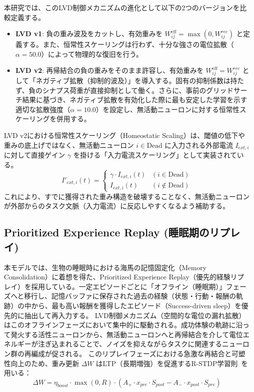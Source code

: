 \documentclass[submit]{ipsj}
\begin{document}
本研究では、このLVD制御メカニズムの進化として以下の2つのバージョンを比較定義する。
\begin{itemize}
    \item \textbf{LVD v1}: 負の重み波及をカットし、有効重みを $W_{ij}^{\text{eff}} = \max(0, W_{ij}^{rec})$ と定義する。また、恒常性スケーリングは行わず、十分な強さの電位拡散（$\alpha=50.0$）によって物理的な復旧を行う。
    \item \textbf{LVD v2}: 再帰結合の負の重みをそのまま許容し、有効重みを $W_{ij}^{\text{eff}} = W_{ij}^{rec}$ として「ネガティブ拡散（抑制的波及）」を導入する。固有の抑制係数は持たず、負のシナプス荷重が直接抑制として働く。さらに、事前のグリッドサーチ結果に基づき、ネガティブ拡散を有効化した際に最も安定した学習を示す適切な拡散強度（$\alpha=10.0$）を設定し、無活動ニューロンに対する恒常性スケーリングを併用する。
\end{itemize}

LVD v2における恒常性スケーリング（Homeostatic Scaling）は、閾値の低下や重みの底上げではなく、無活動ニューロン $i \in \text{Dead}$ に入力される外部電流 $I_{ext,i}$ に対して直接ゲイン $\gamma$ を掛ける「入力電流スケーリング」として実装されている。
\begin{equation}
I'_{ext,i}(t) = 
\begin{cases} 
\gamma \cdot I_{ext,i}(t) & (i \in \text{Dead}) \\
I_{ext,i}(t) & (i \notin \text{Dead})
\end{cases}
\end{equation}
これにより、すでに獲得された重み構造を破壊することなく、無活動ニューロンが外部からのタスク文脈（入力電流）に反応しやすくなるよう補助する。

\subsection{Prioritized Experience Replay (睡眠期のリプレイ)}
本モデルでは、生物の睡眠時における海馬の記憶固定化（Memory Consolidation）に着想を得た、Prioritized Experience Replay（優先的経験リプレイ）を採用している。一定エピソードごとに「オフライン（睡眠期）」フェーズへと移行し、記憶バッファに保存された過去の経験（状態・行動・報酬の軌跡）の中から、最も高い報酬を獲得したエピソード（Success-driven sleep）を優先的に抽出して再入力する。
LVD制御メカニズム（空間的な電位の漏れ拡散）はこのオフラインフェーズにおいて集中的に駆動される。成功体験の軌跡に沿って発火する活性ニューロンから、無活動ニューロンへと再帰結合を介して電位エネルギーが注ぎ込まれることで、ノイズを抑えながらタスクに関連するニューロン群の再編成が促される。
このリプレイフェーズにおける急激な再結合と可塑性向上のため、重み更新 $\Delta W$ はLTP（長期増強）を促進するR-STDP学習則~\cite{izhikevich2007solving,bing2020indirect}を用いる：
\begin{equation}
\Delta W = \eta_{boost} \cdot \max(0, R) \cdot (A_+ \cdot x_{pre} \cdot S_{post} - A_- \cdot x_{post} \cdot S_{pre})
\end{equation}
\end{document}
